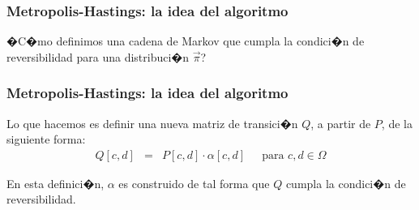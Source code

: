 \documentclass{beamer}
\newcommand{\vs}[1]{\vspace{#1mm}}
\begin{document}
	
	\begin{frame}
		\frametitle{Metropolis-Hastings: la idea del algoritmo}
		
		{\small
			
			�C�mo definimos una cadena de Markov que cumpla la condici�n de reversibilidad para una distribuci�n $\vec \pi$?
			
			\vs{8}
			
			
			\vs{8}
			
			
		}
		
	\end{frame}
	
	
	
	
	
	\begin{frame}
		\frametitle{Metropolis-Hastings: la idea del algoritmo}
		
		{\small
			
			Lo que hacemos es definir una nueva matriz de transici�n $Q$, a partir de $P$, de la siguiente forma:
			\begin{eqnarray*}
				Q[c,d] & = & P[c,d] \cdot \alpha[c,d] \ \ \ \ \ \text{ para } c,d \in \Omega
			\end{eqnarray*}
			
			\vs{8}
			
			En esta definici�n, $\alpha$ es construido de tal forma que $Q$ cumpla la condici�n de reversibilidad. 
			
		}
		
	\end{frame}
	
	
	
	
	
\end{document}
